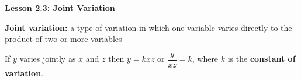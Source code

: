  \begin{center}
\textbf{Lesson 2.3: Joint Variation}
\end{center}

\vspace*{-1.5ex}

\textbf{Joint variation:} a type of variation in which one variable varies
directly to the product of two or more variables

If $y$ varies jointly as $x$ and $z$ then $y = kxz$ or $\dfrac{y}{xz} = k$, where $k$ is the \textbf{constant of variation}.



